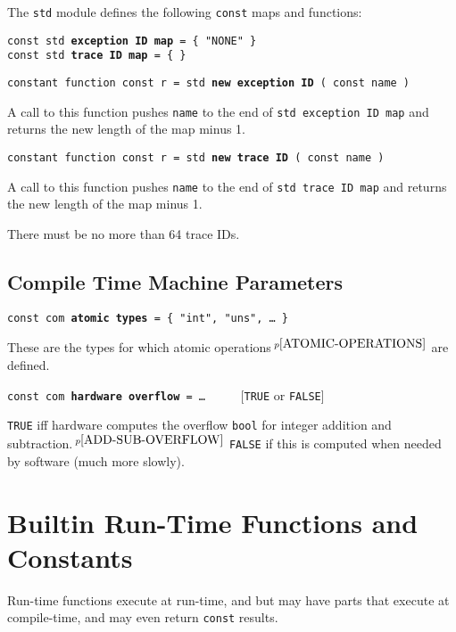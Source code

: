 \documentclass[12pt]{article}
\newcommand{\ttkey}[1]{{\tt \bfseries #1}}
\newcommand{\pagnote}[1]{$\,^{p\pageref{#1}}$}
\newenvironment{indpar}[1][0.3in]%
	{\begin{list}{}%
		     {\setlength{\itemsep}{0in}%
		      \setlength{\topsep}{0in}%
		      \setlength{\parsep}{1ex}%
		      \setlength{\labelwidth}{#1}%
		      \setlength{\leftmargin}{#1}%
		      \addtolength{\leftmargin}{\labelsep}}%
	 \item}%
	{\end{list}}
\begin{document}
The {\tt std} module defines the following {\tt const} maps and functions:

{\tt const std \ttkey{exception ID map} = \{ "NONE" \} } \\
{\tt const std \ttkey{trace ID map} = \{ \}}

{\tt constant function const r = std \ttkey{new exception ID} ( const name ) }%
\label{NEW-EXCEPTION-ID}
\begin{indpar}
A call to this function pushes {\tt name} to the end of
{\tt std exception ID map} and returns the new length of the map minus 1.
\end{indpar}

{\tt constant function const r = std \ttkey{new trace ID} ( const name ) }%
\label{NEW-TRACE-ID}
\begin{indpar}
A call to this function pushes {\tt name} to the end of
{\tt std trace ID map} and returns the new length of the map minus 1.

There must be no more than 64 trace IDs.

\end{indpar}


\subsection{Compile Time Machine Parameters}

{\tt const com \ttkey{atomic types} = \{ "int", "uns", \ldots{} \}}%
\label{ATOMIC-TYPES}
\begin{indpar}
These are the types for which atomic operations\pagnote{ATOMIC-OPERATIONS}
are defined.
\end{indpar}

{\tt const com \ttkey{hardware overflow} =
    \ldots{}} ~~~~~[{\tt TRUE} or {\tt FALSE}]%
\label{HARDWARE-OVERFLOW}
\begin{indpar}
{\tt TRUE} iff hardware computes the overflow {\tt bool} for integer
addition and subtraction.\pagnote{ADD-SUB-OVERFLOW}
{\tt FALSE} if this is computed when needed by software
(much more slowly).
\end{indpar}

\section{Builtin Run-Time Functions and Constants}

Run-time functions execute at run-time, and but may have
parts that execute at compile-time, and may even return
{\tt const} results.
\end{document}
